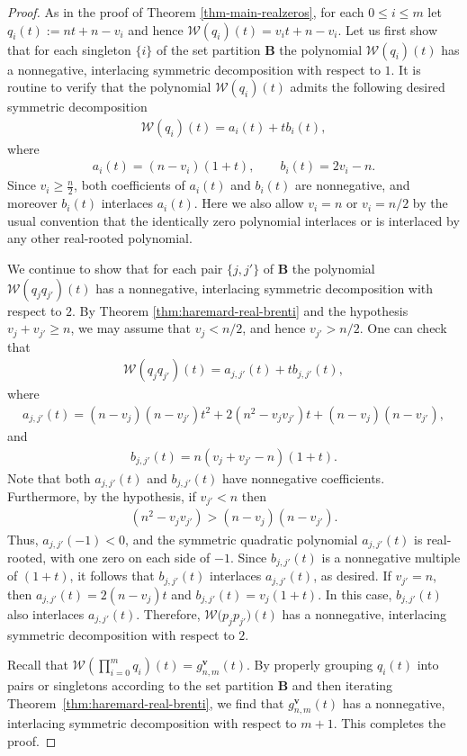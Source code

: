 \documentclass[12pt]{article}
\numberwithin{equation}{section}
\begin{document}
\begin{proof}
As in the proof of Theorem \ref{thm-main-realzeros}, for each $0\le i\le m$ let $q_i(t):=nt+n-v_i$ and hence $\mathcal{W}(q_i)(t)=v_it+n-v_i$.
Let us first show that 
for each singleton $\{i\}$ of the set partition $\mathbf{B}$ the polynomial $\mathcal{W}(q_i)(t)$ has a nonnegative, interlacing symmetric decomposition with respect to $1$. 
It is routine to verify that the polynomial $\mathcal W(q_i)(t)$ admits the following desired symmetric decomposition
\begin{align*}
\mathcal W(q_i)(t)=a_i(t)+tb_i(t),
\end{align*}
where
\begin{align*}
a_i(t)=(n-v_i)(1+t),\qquad b_i(t)=2v_i-n.
\end{align*}
Since $v_i\ge \frac n2$, both coefficients of $a_i(t)$ and $b_i(t)$ are nonnegative, and moreover $b_i(t)$ interlaces $a_i(t)$. Here we also allow $v_i=n$ or $v_i=n/2$ by the usual convention that the identically zero polynomial interlaces or is interlaced by any other real-rooted polynomial.


We continue to show that for each pair $\{j,j'\}$ of $\mathbf{B}$ the polynomial 
$\mathcal{W}(q_{j}q_{j'})(t)$ has a nonnegative, interlacing symmetric decomposition with respect to $2$.
By Theorem \ref{thm:haremard-real-brenti} and the hypothesis $v_{j}+v_{j'}\ge n$, we may assume that $v_{j}<n/2$, and hence $v_{j'}> n/2$. 
One can check that 
\begin{align*}
\mathcal W(q_{j}q_{j'})(t)=a_{j,j'}(t)+tb_{j,j'}(t),    
\end{align*}
where 
\begin{align*}
a_{j,j'}(t)={(n-v_{j})(n-v_{j'})t^2+2(n^2-v_{j}v_{j'})t+(n-v_{j})(n-v_{j'})},    
\end{align*}
and
\begin{align*}
b_{j,j'}(t)=n(v_{j}+v_{j'}-n)(1+t).    
\end{align*}
Note that both $a_{j,j'}(t)$ and $b_{j,j'}(t)$ have nonnegative coefficients. Furthermore, by the hypothesis, if $v_{j'}<n$ then
\begin{align*}
(n^2-v_{j}v_{j'})>(n-v_{j})(n-v_{j'}).
\end{align*}
Thus, $a_{j,j'}(-1)<0$, and the symmetric quadratic polynomial $a_{j,j'}(t)$ is real-rooted, with one zero on each side of $-1$.
Since $b_{j,j'}(t)$ is a nonnegative multiple of $(1+t)$, it follows that $b_{j,j'}(t)$ interlaces $a_{j,j'}(t)$, as desired. 
{If $v_{j'}=n$, then $a_{j,j'}(t)={2(n-v_{j})t}$ and $b_{j,j'}(t)={v_{j}(1+t)}$. In this case, $b_{j,j'}(t)$ also interlaces $a_{j,j'}(t)$.} Therefore, $\mathcal W\bigl(p_{j}p_{j'}\bigr)(t)$ has a nonnegative, interlacing symmetric decomposition with respect to $2$.

Recall that $\mathcal W\!\left(\prod_{i=0}^m q_i\right)(t)=g^{\mathbf v}_{n,m}(t)$.
By properly grouping $q_i(t)$ into pairs or singletons according to the set partition $\mathbf{B}$ and then iterating Theorem~\ref{thm:haremard-real-brenti}, we find that $g^{\mathbf v}_{n,m}(t)$
has a nonnegative, interlacing symmetric decomposition with respect to $m+1$. This completes the proof.
\end{proof}
\end{document}
